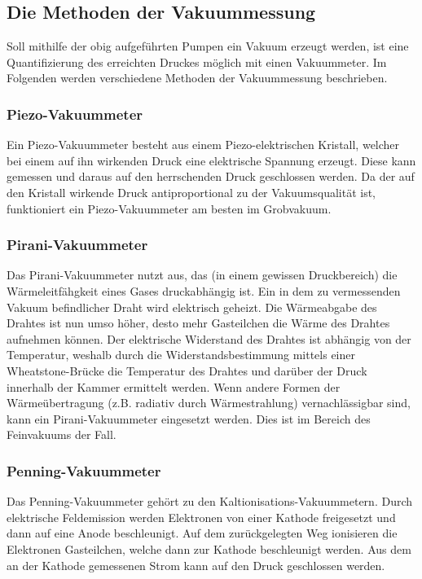 \subsection{Die Methoden der Vakuummessung}
Soll mithilfe der obig aufgeführten Pumpen ein Vakuum erzeugt werden, ist eine
Quantifizierung des erreichten Druckes möglich mit einen Vakuummeter. Im Folgenden
werden verschiedene Methoden der Vakuummessung beschrieben.

\subsubsection*{Piezo-Vakuummeter}
Ein Piezo-Vakuummeter besteht aus einem Piezo-elektrischen Kristall, welcher bei einem auf ihn wirkenden
Druck eine elektrische Spannung erzeugt. Diese kann gemessen und daraus auf den herrschenden Druck geschlossen
werden. Da der auf den Kristall wirkende Druck antiproportional zu der Vakuumsqualität ist, funktioniert ein
Piezo-Vakuummeter am besten im Grobvakuum.
\subsubsection*{Pirani-Vakuummeter}
Das Pirani-Vakuummeter nutzt aus, das (in einem gewissen Druckbereich) die Wärmeleitfähgkeit
eines Gases druckabhängig ist. Ein in dem zu vermessenden Vakuum befindlicher Draht wird elektrisch geheizt.
Die Wärmeabgabe des Drahtes ist nun umso höher, desto mehr Gasteilchen die Wärme des Drahtes
aufnehmen können. Der elektrische Widerstand des Drahtes ist abhängig von der Temperatur, weshalb
durch die Widerstandsbestimmung mittels einer Wheatstone-Brücke die Temperatur des Drahtes und darüber der Druck
innerhalb der Kammer ermittelt werden. Wenn andere Formen der Wärmeübertragung (z.B. radiativ durch Wärmestrahlung)
vernachlässigbar sind, kann ein Pirani-Vakuummeter eingesetzt werden. Dies ist im Bereich des Feinvakuums der Fall.

\subsubsection*{Penning-Vakuummeter}
Das Penning-Vakuummeter gehört zu den Kaltionisations-Vakuummetern. Durch elektrische Feldemission werden
Elektronen von einer Kathode freigesetzt und dann auf eine Anode beschleunigt. Auf dem zurückgelegten Weg
ionisieren die Elektronen Gasteilchen, welche dann zur Kathode beschleunigt werden. Aus dem an der Kathode
gemessenen Strom kann auf den Druck geschlossen werden.

